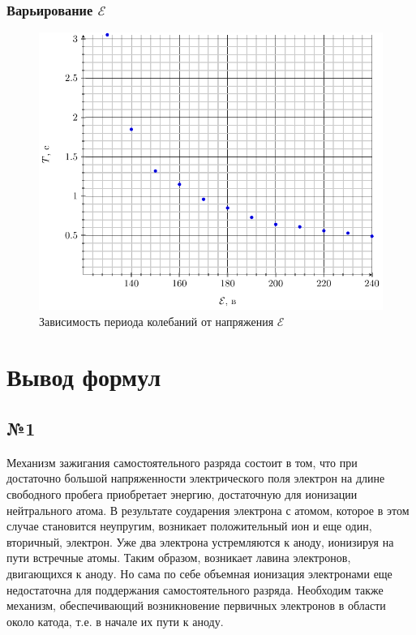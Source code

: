 \subsubsection{Варьирование $\mathcal{E}$}

\begin{figure}[H]
	\centering
	\includegraphics[width=\textwidth]{T_E}
	\caption{Зависимость периода колебаний от напряжения $\mathcal{E}$}
	\label{fig:figure1}
\end{figure}

\newpage
\section{Вывод формул}
\subsection{№1}
Механизм зажигания самостоятельного разряда состоит в том, что при достаточно большой напряженности электрического поля электрон на длине свободного пробега приобретает энергию, достаточную для ионизации нейтрального атома. В результате соударения электрона с атомом, которое в этом случае становится неупругим, возникает положительный ион и еще один, вторичный, электрон. Уже два электрона устремляются к аноду, ионизируя на пути встречные атомы. Таким образом, возникает лавина электронов, двигающихся к аноду. Но сама по себе объемная ионизация электронами еще недостаточна для поддержания самостоятельного разряда. Необходим также механизм, обеспечивающий возникновение первичных электронов в области около катода, т.е. в начале их пути к аноду. 

